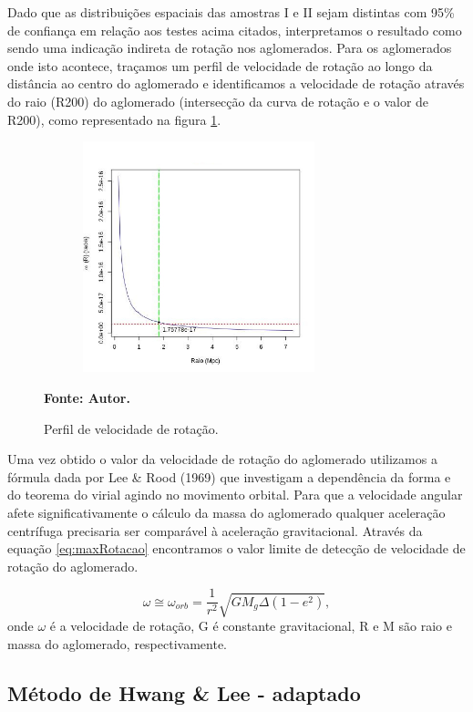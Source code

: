 Dado que as distribuições espaciais das amostras  I e II sejam distintas com 95\% de confiança em relação aos testes acima citados, interpretamos o resultado como sendo uma indicação indireta de rotação nos aglomerados. Para os aglomerados onde isto acontece, traçamos um perfil de velocidade
de rotação ao longo da distância ao centro do aglomerado e identificamos a velocidade de rotação através do raio (R200) do aglomerado (intersecção da curva de rotação e o valor de R200), como representado na figura \ref{rotacao}.

\begin{figure}[H] %
\vspace{-2pt}
\begin{center}
\includegraphics[height=6.7cm,width=9cm]{04-figuras/rotacao}%
\caption{Perfil de velocidade de rotação.}
\textbf{Fonte: Autor.}
\label{rotacao}%
\end{center}
\end{figure}

Uma vez obtido o valor da velocidade de rotação do aglomerado utilizamos a fórmula dada por Lee \& Rood (1969) que investigam a dependência da forma e do teorema do virial agindo no movimento orbital. Para que a velocidade angular afete significativamente o cálculo da massa do aglomerado qualquer aceleração centrífuga precisaria ser comparável à aceleração gravitacional. Através da equação \ref{eq:maxRotacao} encontramos o valor limite de detecção de velocidade de rotação do aglomerado.

\begin{equation}
\omega \cong \omega_{orb} = \frac{1}{r^2} \sqrt{G M_g \Delta (1 - e^2)}, 
\label{eq:maxRotacao}
\end{equation}
onde $\omega$ é a velocidade de rotação, G é constante gravitacional, R e M são raio e massa do aglomerado, respectivamente. 

\subsection{Método de Hwang \& Lee - adaptado}

